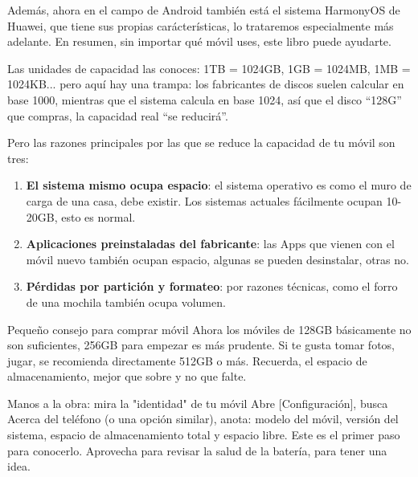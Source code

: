 Además, ahora en el campo de Android también está el sistema HarmonyOS de Huawei, que tiene sus propias carácterísticas, lo trataremos especialmente más adelante. En resumen, sin importar qué móvil uses, este libro puede ayudarte.


Las unidades de capacidad las conoces: 1TB = 1024GB, 1GB = 1024MB, 1MB = 1024KB... pero aquí hay una trampa: los fabricantes de discos suelen calcular en base 1000, mientras que el sistema calcula en base 1024, así que el disco “128G” que compras, la capacidad real “se reducirá”.

Pero las razones principales por las que se reduce la capacidad de tu móvil son tres:

\begin{enumerate}
  \item \textbf{El sistema mismo ocupa espacio}: el sistema operativo es como el muro de carga de una casa, debe existir. Los sistemas actuales fácilmente ocupan 10-20GB, esto es normal.
  \item \textbf{Aplicaciones preinstaladas del fabricante}: las Apps que vienen con el móvil nuevo también ocupan espacio, algunas se pueden desinstalar, otras no.
  \item \textbf{Pérdidas por partición y formateo}: por razones técnicas, como el forro de una mochila también ocupa volumen.
\end{enumerate}

\begin{tcbinfo}{Pequeño consejo para comprar móvil}
Ahora los móviles de 128GB básicamente no son suficientes, 256GB para empezar es más prudente. Si te gusta tomar fotos, jugar, se recomienda directamente 512GB o más. Recuerda, el espacio de almacenamiento, mejor que sobre y no que falte.

\end{tcbinfo}

\begin{tcbpractice}{Manos a la obra: mira la "identidad" de tu móvil}
Abre [Configuración], busca Acerca del teléfono (o una opción similar), anota: modelo del móvil, versión del sistema, espacio de almacenamiento total y espacio libre. Este es el primer paso para conocerlo. Aprovecha para revisar la salud de la batería, para tener una idea.

\end{tcbpractice}


